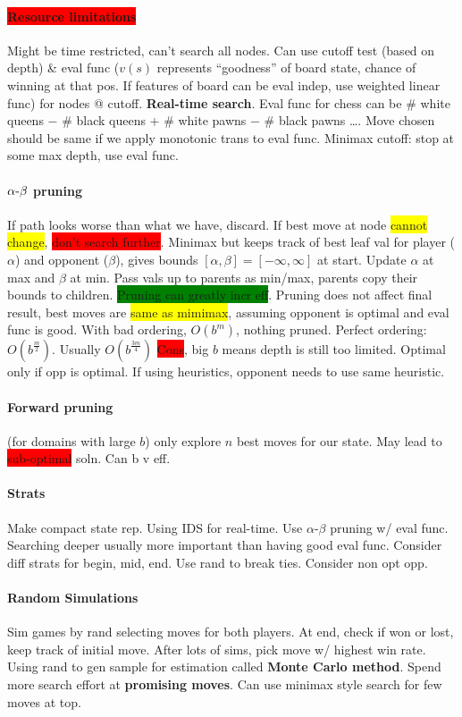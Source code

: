 \paragraph{\colorbox{red}{Resource limitations}} Might be time
restricted, can't search all nodes. Can use cutoff test (based on
depth) \& eval func ($v(s)$ represents ``goodness'' of board state,
chance of winning at that pos. If features of board can be eval indep,
use weighted linear func) for nodes @ cutoff. \textbf{Real-time
  search}. Eval func for chess can be \# white queens $-$ \# black
queens + \# white pawns $-$ \# black pawns \ldots. Move chosen should
be same if we apply monotonic trans to eval func. Minimax cutoff: stop
at some max depth, use eval func.
\paragraph{$\alpha\hbox{-}\beta$ pruning} If path looks worse than
what we have, discard. If best move at node \colorbox{yellow}{cannot change}, \colorbox{red}{don't
search further}. Minimax but keeps track of best leaf val for player
($\alpha$) and opponent ($\beta$), gives bounds
$[\alpha,\beta]=[-\infty,\infty]$ at start. Update $\alpha$ at max and
$\beta$ at min. Pass vals up to parents as min/max, parents copy their
bounds to children. \colorbox{green}{Pruning can greatly incr
  eff}. Pruning does not affect final result, best moves are
\colorbox{yellow}{same as mimimax}, assuming opponent is optimal and
eval func is good. With bad ordering, $O(b^m)$, nothing
pruned. Perfect ordering: $O(b^{\frac{m}{2}})$. Usually
$O(b^{\frac{3m}{4}})$ \colorbox{red}{Cons}, big $b$ means depth is
still too limited. Optimal only if opp is optimal. If using
heuristics, opponent needs to use same heuristic.
\paragraph{Forward pruning} (for domains with large $b$) only explore
$n$ best moves for our state. May lead to \colorbox{red}{sub-optimal}
soln. Can b v eff.
\paragraph{Strats} Make compact state rep. Using IDS for
real-time. Use $\alpha$-$\beta$ pruning w/ eval func. Searching deeper
usually more important than having good eval func. Consider diff
strats for begin, mid, end. Use rand to break ties. Consider non opt opp.
\paragraph{Random Simulations} Sim games by rand selecting moves for
both players. At end, check if won or lost, keep track of initial
move. After lots of sims, pick move w/ highest win rate. Using rand to
gen sample for estimation called \textbf{Monte Carlo method}. Spend more search effort at \textbf{promising
  moves}. Can use minimax style search for few moves at top.
